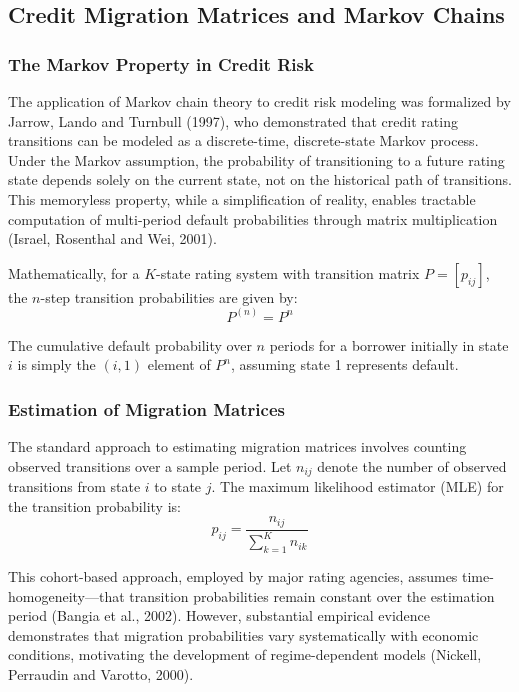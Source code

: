 \documentclass[12pt,a4paper]{article}
\begin{document}
\subsection{Credit Migration Matrices and Markov Chains}

\subsubsection{The Markov Property in Credit Risk}

The application of Markov chain theory to credit risk modeling was formalized by Jarrow, Lando and Turnbull (1997), who demonstrated that credit rating transitions can be modeled as a discrete-time, discrete-state Markov process. Under the Markov assumption, the probability of transitioning to a future rating state depends solely on the current state, not on the historical path of transitions. This memoryless property, while a simplification of reality, enables tractable computation of multi-period default probabilities through matrix multiplication (Israel, Rosenthal and Wei, 2001).

Mathematically, for a $K$-state rating system with transition matrix $P = [p_{ij}]$, the $n$-step transition probabilities are given by:
\begin{equation}
P^{(n)} = P^n
\end{equation}

The cumulative default probability over $n$ periods for a borrower initially in state $i$ is simply the $(i,1)$ element of $P^n$, assuming state 1 represents default.

\subsubsection{Estimation of Migration Matrices}

The standard approach to estimating migration matrices involves counting observed transitions over a sample period. Let $n_{ij}$ denote the number of observed transitions from state $i$ to state $j$. The maximum likelihood estimator (MLE) for the transition probability is:
\begin{equation}
\hat{p}_{ij} = \frac{n_{ij}}{\sum_{k=1}^{K} n_{ik}}
\end{equation}

This cohort-based approach, employed by major rating agencies, assumes time-homogeneity---that transition probabilities remain constant over the estimation period (Bangia et al., 2002). However, substantial empirical evidence demonstrates that migration probabilities vary systematically with economic conditions, motivating the development of regime-dependent models (Nickell, Perraudin and Varotto, 2000).
\end{document}
